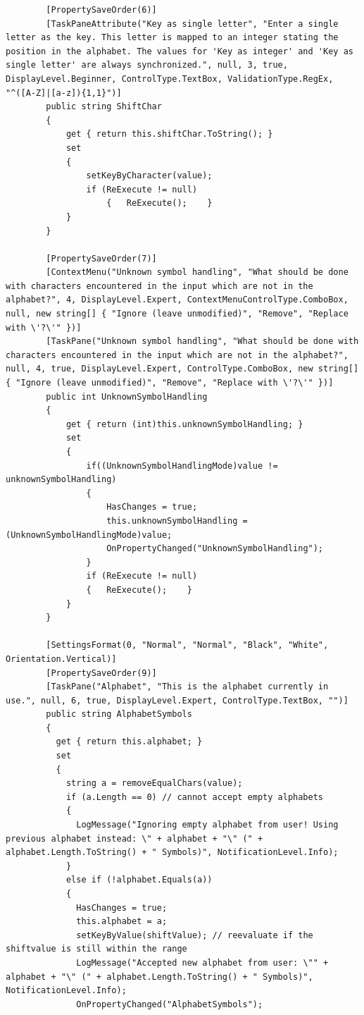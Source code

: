 \begin{lstlisting}
        [PropertySaveOrder(6)]
        [TaskPaneAttribute("Key as single letter", "Enter a single letter as the key. This letter is mapped to an integer stating the position in the alphabet. The values for 'Key as integer' and 'Key as single letter' are always synchronized.", null, 3, true, DisplayLevel.Beginner, ControlType.TextBox, ValidationType.RegEx, "^([A-Z]|[a-z]){1,1}")]
        public string ShiftChar
        {
            get { return this.shiftChar.ToString(); }
            set
            {
                setKeyByCharacter(value);
                if (ReExecute != null)
	                {   ReExecute();    }
            }
        }

        [PropertySaveOrder(7)]
        [ContextMenu("Unknown symbol handling", "What should be done with characters encountered in the input which are not in the alphabet?", 4, DisplayLevel.Expert, ContextMenuControlType.ComboBox, null, new string[] { "Ignore (leave unmodified)", "Remove", "Replace with \'?\'" })]
        [TaskPane("Unknown symbol handling", "What should be done with characters encountered in the input which are not in the alphabet?", null, 4, true, DisplayLevel.Expert, ControlType.ComboBox, new string[] { "Ignore (leave unmodified)", "Remove", "Replace with \'?\'" })]
        public int UnknownSymbolHandling
        {
            get { return (int)this.unknownSymbolHandling; }
            set
            {
                if((UnknownSymbolHandlingMode)value != unknownSymbolHandling)
                {
                	HasChanges = true;
	                this.unknownSymbolHandling = (UnknownSymbolHandlingMode)value;
    	            OnPropertyChanged("UnknownSymbolHandling");
				}
                if (ReExecute != null) 
                {	ReExecute();	}
            }
        }

        [SettingsFormat(0, "Normal", "Normal", "Black", "White", Orientation.Vertical)]
        [PropertySaveOrder(9)]
        [TaskPane("Alphabet", "This is the alphabet currently in use.", null, 6, true, DisplayLevel.Expert, ControlType.TextBox, "")]
        public string AlphabetSymbols
        {
          get { return this.alphabet; }
          set
          {
            string a = removeEqualChars(value);
            if (a.Length == 0) // cannot accept empty alphabets
            {
              LogMessage("Ignoring empty alphabet from user! Using previous alphabet instead: \" + alphabet + "\" (" + alphabet.Length.ToString() + " Symbols)", NotificationLevel.Info);
            }
            else if (!alphabet.Equals(a))
            {
              HasChanges = true;
              this.alphabet = a;
              setKeyByValue(shiftValue); // reevaluate if the shiftvalue is still within the range
              LogMessage("Accepted new alphabet from user: \"" + alphabet + "\" (" + alphabet.Length.ToString() + " Symbols)", NotificationLevel.Info);
              OnPropertyChanged("AlphabetSymbols");


\end{lstlisting}
